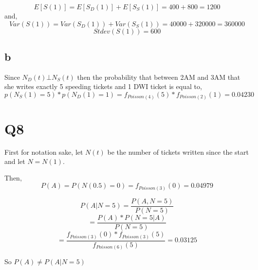 \documentclass{article}
\begin{document}
$$
E[S(1)] = E[S_D(1)] + E[S_S(1)] = 400 + 800 = 1200
$$
and,
$$
Var(S(1)) = Var(S_D(1)) + Var(S_S(1)) =  40000 + 320000 = 360000
$$
$$
Stdev(S(1)) = 600
$$

\subsection*{b}
Since $N_D(t) \bot N_S(t)$ then the probability that between 2AM and 3AM that she writes exactly 5 speeding tickets and 1 DWI ticket is equal to,
$$
p(N_S(1) = 5)* p(N_D(1) = 1) = f_{Poisson(4)}(5) * f_{Poisson(2)}(1) = 0.04230
$$

\section*{Q8}
First for notation sake, let $N(t)$ be the number of tickets written since the start and let $N = N(1)$.

Then,
$$
P(A) = P(N(0.5) = 0) = f_{Poisson(3)}(0) =  0.04979
$$

$$
P(A | N = 5) = \frac{P(A , N = 5)}{P(N = 5)} 
$$
$$
= \frac{P(A) * P(N = 5 | A)}{P(N = 5)}  
$$
$$
= \frac{f_{Poisson(3)}(0) * f_{Poisson(3)}(5)}{f_{Poisson(6)}(5)} = 0.03125 
$$

So $P(A) \neq P(A | N = 5)$
\end{document}
